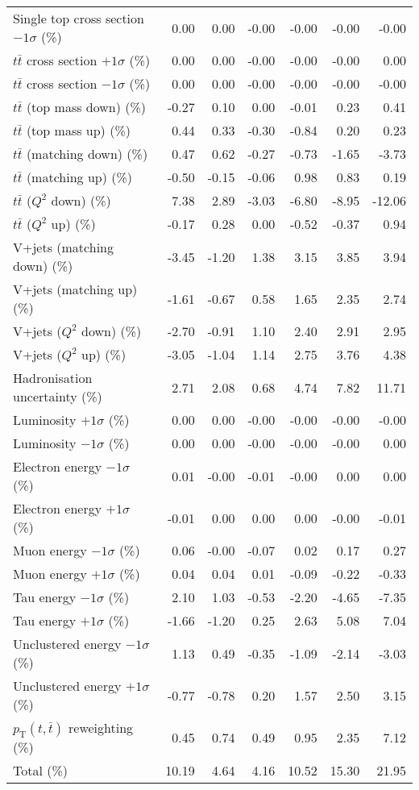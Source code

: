 \begin{table}[htbp]
{\begin{tabular}{lrrrrrr}
Single top cross section $-1\sigma$ (\%) & 0.00 & 0.00 & -0.00 & -0.00 & -0.00 & -0.00 \\ 
$t\bar{t}$ cross section $+1\sigma$ (\%) & 0.00 & 0.00 & -0.00 & -0.00 & -0.00 & 0.00 \\ 
$t\bar{t}$ cross section $-1\sigma$ (\%) & 0.00 & 0.00 & -0.00 & -0.00 & -0.00 & -0.00 \\ 
$t\bar{t}$ (top mass down) (\%) & -0.27 & 0.10 & 0.00 & -0.01 & 0.23 & 0.41 \\ 
$t\bar{t}$ (top mass up) (\%) & 0.44 & 0.33 & -0.30 & -0.84 & 0.20 & 0.23 \\ 
$t\bar{t}$ (matching down) (\%) & 0.47 & 0.62 & -0.27 & -0.73 & -1.65 & -3.73 \\ 
$t\bar{t}$ (matching up) (\%) & -0.50 & -0.15 & -0.06 & 0.98 & 0.83 & 0.19 \\ 
$t\bar{t}$ ($Q^{2}$ down) (\%) & 7.38 & 2.89 & -3.03 & -6.80 & -8.95 & -12.06 \\ 
$t\bar{t}$ ($Q^{2}$ up) (\%) & -0.17 & 0.28 & 0.00 & -0.52 & -0.37 & 0.94 \\ 
V+jets (matching down) (\%) & -3.45 & -1.20 & 1.38 & 3.15 & 3.85 & 3.94 \\ 
V+jets (matching up) (\%) & -1.61 & -0.67 & 0.58 & 1.65 & 2.35 & 2.74 \\ 
V+jets ($Q^{2}$ down) (\%) & -2.70 & -0.91 & 1.10 & 2.40 & 2.91 & 2.95 \\ 
V+jets ($Q^{2}$ up) (\%) & -3.05 & -1.04 & 1.14 & 2.75 & 3.76 & 4.38 \\ 
Hadronisation uncertainty (\%) & 2.71 & 2.08 & 0.68 & 4.74 & 7.82 & 11.71 \\ 
Luminosity $+1\sigma$ (\%) & 0.00 & 0.00 & -0.00 & -0.00 & -0.00 & -0.00 \\ 
Luminosity $-1\sigma$ (\%) & 0.00 & 0.00 & -0.00 & -0.00 & -0.00 & 0.00 \\ 
Electron energy $-1\sigma$ (\%) & 0.01 & -0.00 & -0.01 & -0.00 & 0.00 & 0.00 \\ 
Electron energy $+1\sigma$ (\%) & -0.01 & 0.00 & 0.00 & 0.00 & -0.00 & -0.01 \\ 
Muon energy $-1\sigma$ (\%) & 0.06 & -0.00 & -0.07 & 0.02 & 0.17 & 0.27 \\ 
Muon energy $+1\sigma$ (\%) & 0.04 & 0.04 & 0.01 & -0.09 & -0.22 & -0.33 \\ 
Tau energy $-1\sigma$ (\%) & 2.10 & 1.03 & -0.53 & -2.20 & -4.65 & -7.35 \\ 
Tau energy $+1\sigma$ (\%) & -1.66 & -1.20 & 0.25 & 2.63 & 5.08 & 7.04 \\ 
Unclustered energy $-1\sigma$ (\%) & 1.13 & 0.49 & -0.35 & -1.09 & -2.14 & -3.03 \\ 
Unclustered energy $+1\sigma$ (\%) & -0.77 & -0.78 & 0.20 & 1.57 & 2.50 & 3.15 \\ 
$p_\mathrm{T}(t,\bar{t})$ reweighting (\%) & 0.45 & 0.74 & 0.49 & 0.95 & 2.35 & 7.12 \\ 
\hline 
Total (\%) & 10.19  & 4.64  & 4.16  & 10.52  & 15.30  & 21.95 \\ 
\hline 
\end{tabular}
}
\end{table}
